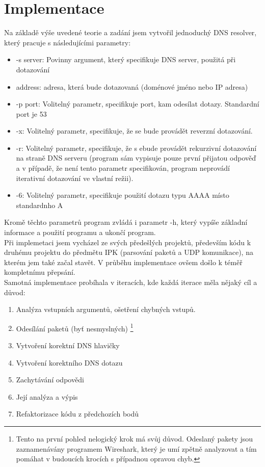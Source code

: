 \documentclass[a4paper, 11pt]{article}
\begin{document}
\section{Implementace}
Na základě výše uvedené teorie a zadání jsem vytvořil jednoduchý DNS resolver, který pracuje s následujícími parametry: 
\begin{itemize}
	\item -s server: Povinny argument, který specifikuje DNS server, použitá při dotazování
	\item address: adresa, která bude dotazovaná (doménové jméno nebo IP adresa) 
	\item -p port: Volitelný parametr, specifikuje port, kam odesílat dotazy. Standardní port je 53
	\item -x: Volitelný parametr, specifikuje, že se bude provádět reverzní dotazování.
	\item -r: Volitelný parametr, specifikuje, že s ebude provádět rekurzivní dotazování na straně DNS serveru (program sám vypisuje pouze první přijatou odpověď a v případě, že není tento parametr specifikován, program neprovádí iterativní dotazování ve vlastní režii).
	\item -6: Volitelný parametr, specifikuje použití dotazu typu AAAA místo standardnho A
\end{itemize}
Kromě těchto parametrů program zvládá i parametr -h, který vypíše základní informace a použití programu a ukončí program. \\

Při implemetaci jsem vycházel ze svých předešlých projektů, především kódu k druhému projektu do předmětu IPK (parsování paketů a UDP komunikace), na kterém jem také začal stavět. V průběhu implementace ovšem došlo k téměř kompletnímu přepsání. \\

Samotná implementace probíhala v iteracích, kde každá iterace měla nějaký cíl a důvod:
 \begin{enumerate}
    \item Analýza vstupních argumentů, ošetření chybných vstupů.
     \item Odesílání paketů (byť nesmyslných) \footnote{Tento na první pohled nelogický krok má svůj důvod. Odeslaný pakety jsou zaznamenávány programem Wireshark, který je umí zpětně analyzovat a tím pomáhat v budoucích krocích s případnou opravou chyb.}
     \item Vytvoření korektní DNS hlavičky
     \item Vytvoření korektního DNS dotazu
     \item Zachytávání odpovědi
     \item Její analýza a výpis
     \item Refaktorizace kódu z předchozích bodů
 \end{enumerate}
\end{document}
